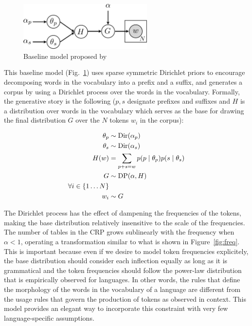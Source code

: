 \begin{figure}[h]
  \centering
  \includegraphics[width=0.6\textwidth]{fig/v1}
  \caption{Baseline model proposed by \cite{goldwater2011}}
  \label{fig:v1}
\end{figure}

This baseline model (Fig.~\ref{fig:v1}) uses sparse symmetric Dirichlet priors to encourage decomposing words in the vocabulary into a prefix and a suffix, and generates a corpus by using a Dirichlet process over the words in the vocabulary. Formally, the generative story is the following ($p,s$ designate prefixes and suffixes and $H$ is a distribution over words in the vocabulary which serves as the base for drawing the final distribution $G$ over the $N$ tokens $w_i$ in the corpus):

\begin{align*}
  \theta_p & \sim \mathrm{Dir}(\alpha_p) \\
  \theta_s & \sim \mathrm{Dir}(\alpha_s) \\
  H(w) & = \sum_{p+s=w} p(p \mid \theta_p) p(s \mid \theta_s) \\
  G & \sim \mathrm{DP}(\alpha, H) \\
  \forall i \in \{1 \dots N\} \\
  w_i & \sim G
\end{align*}

The Dirichlet process has the effect of dampening the frequencies of the tokens, making the base distribution relatively insensitive to the scale of the frequencies. The number of tables in the CRP grows sublinearly \cite{goldwater2011} with the frequency when $\alpha < 1$, operating a transformation similar to what is shown in Figure~\ref{fig:freq}. This is important because even if we desire to model token frequencies explicitely, the base distribution should consider each inflection equally as long as it is grammatical and the token frequencies should follow the power-law distribution that is empirically observed for languages. In other words, the rules that define the morphology of the words in the vocabulary of a language are different from the usage rules that govern the production of tokens as observed in context. This model provides an elegant way to incorporate this constraint with very few language-specific assumptions.

